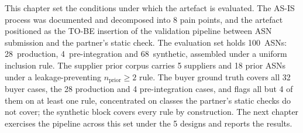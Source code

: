 This chapter set the conditions under which the artefact is evaluated. The AS-IS process was documented and decomposed into 8 pain points, and the artefact positioned as the TO-BE insertion of the validation pipeline between ASN submission and the partner's static check. The evaluation set holds 100~ASNs: 28~production, 4~pre-integration and 68~synthetic, assembled under a uniform inclusion rule. The supplier prior corpus carries 5 suppliers and 18 prior ASNs under a leakage-preventing $n_{\text{prior}} \geq 2$ rule. The buyer ground truth covers all 32 buyer cases, the 28 production and 4 pre-integration cases, and flags all but 4 of them on at least one rule, concentrated on classes the partner's static checks do not cover; the synthetic block covers every rule by construction. The next chapter exercises the pipeline across this set under the 5 designs and reports the results.
